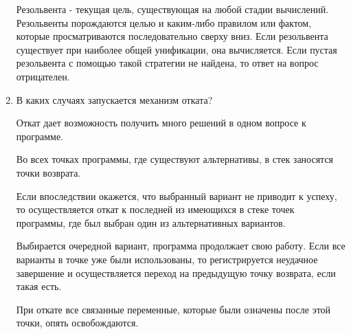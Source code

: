 \documentclass[a4paper,14pt]{extreport} %
\begin{document}
\begin{enumerate}
Резольвента - текущая цель, существующая на любой стадии вычислений. Резольвенты порождаются целью и каким-либо правилом или фактом, которые просматриваются последовательно сверху вниз. Если резольвента существует при наиболее общей унификации, она вычисляется. Если пустая резольвента с помощью такой стратегии не найдена, то ответ на вопрос отрицателен.

\item В каких случаях запускается механизм отката?

Откат дает возможность получить много решений в одном вопросе к программе. 

Во всех точках программы, где существуют альтернативы, в стек заносятся точки возврата. 

Если впоследствии окажется, что выбранный вариант не приводит к успеху, то осуществляется откат к последней из имеющихся в стеке точек программы, где был выбран один из альтернативных вариантов. 

Выбирается очередной вариант, программа продолжает свою работу. Если все варианты в точке уже были использованы, то регистрируется неудачное завершение и осуществляется переход на предыдущую точку возврата, если такая есть. 

При откате все связанные переменные, которые были означены после этой точки, опять освобождаются.

\end{enumerate}
 
\end{document}

